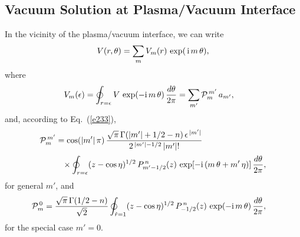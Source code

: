 \documentclass[12pt,prb,aps]{revtex4-1}
\begin{document}
\subsection{Vacuum Solution at Plasma/Vacuum Interface}\label{prdef}
In the vicinity of the plasma/vacuum interface, we can write
\begin{equation}\label{e193tt}
V(r,\theta) = \sum_m V_m(r)\,\exp(\,{\rm i}\,m\,\theta),
\end{equation}
where
\begin{align}\label{e344}
V_m (\epsilon)&= \oint_{r=\epsilon}V\,\exp(-{\rm i}\,m\,\theta)\,\frac{d\theta}{2\pi}= \sum_{m'}{\cal P}_m^{\,m'}\,a_{m'},
\end{align}
and, according to Eq.~(\ref{e233}), 
\begin{align}
{\cal P}_m^{\,m'} &=
\cos(|m'|\,\pi)\,\frac{\sqrt{\pi}\,\Gamma(|m'|+1/2-n)\,\epsilon^{\,|m'|}}{2^{\,|m'|-1/2}\,|m'|!}\nonumber\\[0.5ex]
&\phantom{=}\times
\oint_{r=\epsilon}(z-\cos\eta)^{1/2}\,P_{m'-1/2}^{\,n}(z)\,\exp[-{\rm i}\,(m\,\theta+m'\,\eta)]\,\frac{d\theta}{2\pi},\label{e346}
\end{align}
for general $m'$, and 
\begin{align}
{\cal P}_m^{\,0} &=
\frac{\sqrt{\pi}\,\Gamma(1/2-n)}{\sqrt{2}}\oint_{\hat{r}=1}
(z-\cos\eta)^{1/2}\,P_{-1/2}^{\,n}(z)\,\exp(-{\rm i}\,m\,\theta)\,\frac{d\theta}{2\pi},\label{e348}
\end{align}
for the special case $m'=0$. 
\end{document}
